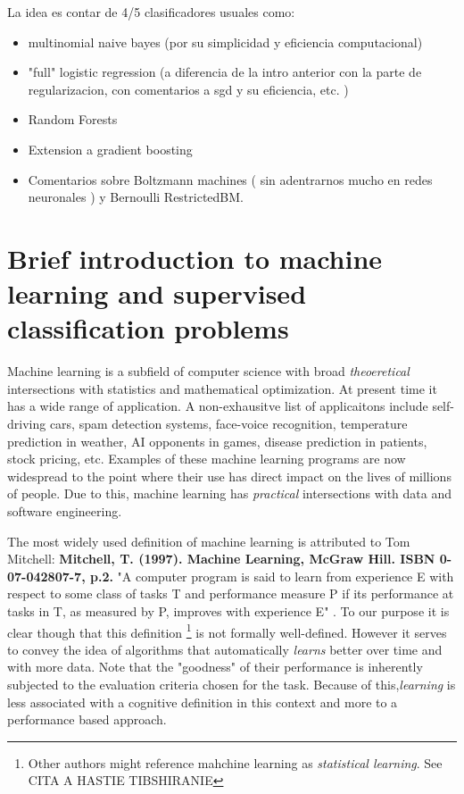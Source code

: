 La idea es contar de 4/5 clasificadores usuales como:

\begin{itemize}
	\item multinomial naive bayes (por su simplicidad y eficiencia computacional)
	\item "full" logistic regression (a diferencia de la intro anterior con la parte de regularizacion, con comentarios a sgd y su eficiencia, etc. )
	\item Random Forests
	\item Extension a gradient boosting
	\item Comentarios sobre Boltzmann machines ( sin adentrarnos mucho en redes neuronales ) y Bernoulli RestrictedBM.
\end{itemize}

\section{ Brief introduction to machine learning and supervised classification problems}

Machine learning is a subfield of computer science with broad \textit{theoeretical} intersections with statistics and mathematical optimization. At present time it has a wide range of application. A non-exhausitve list of applicaitons include self-driving cars, spam detection systems, face-voice recognition, temperature prediction in weather, AI opponents in games, disease prediction in patients, stock pricing, etc. Examples of these machine learning programs are now widespread to the point where their use has direct impact on the lives of millions of people. Due to this, machine learning has \textit{practical} intersections with data and software engineering.

The most widely used definition of machine learning is attributed to Tom Mitchell: 	\textbf{Mitchell, T. (1997). Machine Learning, McGraw Hill. ISBN 0-07-042807-7, p.2.} 
"A computer program is said to learn from experience E with respect to some class of tasks T and performance measure P if its performance at tasks in T, as measured by P, improves with experience E" . To our purpose it is clear though that this definition \footnote{Other authors might reference mahchine learning as \textit{statistical learning}. See CITA A HASTIE TIBSHIRANIE} is not formally well-defined. However it serves to convey the idea of algorithms that automatically \textit{learns} better over time and with more data. Note that the "goodness" of their performance is inherently subjected to the evaluation criteria chosen for the task. Because of this,\textit{learning} is less associated with a cognitive definition in this context and more to a performance based approach.


